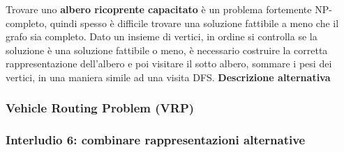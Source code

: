 \documentclass{article}
\begin{document}
Trovare uno \textbf{albero ricoprente capacitato} è un problema fortemente NP-completo, quindi spesso
è difficile trovare una soluzione fattibile a meno che il grafo sia completo. Dato un insieme di vertici,
in ordine si controlla se la soluzione è una soluzione fattibile o meno, è necessario costruire
la corretta rappresentazione dell'albero e poi visitare il sotto albero, sommare i pesi dei vertici, in
una maniera simile ad una visita DFS.
\newline
\newline
\textbf{Descrizione alternativa}
\newline


\subsubsection{Vehicle Routing Problem (VRP)}
\subsubsection{Interludio 6: combinare rappresentazioni alternative}
\end{document}
